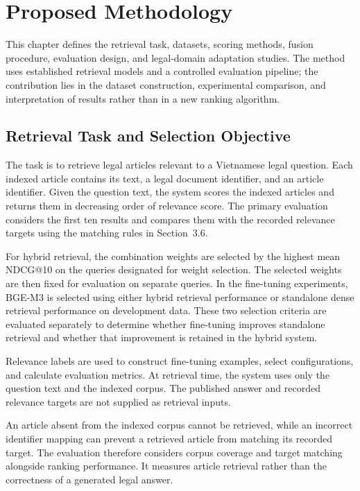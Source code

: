 \chapter{Proposed Methodology}

This chapter defines the retrieval task, datasets, scoring methods, fusion procedure, evaluation design, and legal-domain adaptation studies. The method uses established retrieval models and a controlled evaluation pipeline; the contribution lies in the dataset construction, experimental comparison, and interpretation of results rather than in a new ranking algorithm.

\section{Retrieval Task and Selection Objective}

The task is to retrieve legal articles relevant to a Vietnamese legal question. Each indexed article contains its text, a legal document identifier, and an article identifier. Given the question text, the system scores the indexed articles and returns them in decreasing order of relevance score. The primary evaluation considers the first ten results and compares them with the recorded relevance targets using the matching rules in Section~3.6.

For hybrid retrieval, the combination weights are selected by the highest mean NDCG@10 on the queries designated for weight selection. The selected weights are then fixed for evaluation on separate queries. In the fine-tuning experiments, BGE-M3 is selected using either hybrid retrieval performance or standalone dense retrieval performance on development data. These two selection criteria are evaluated separately to determine whether fine-tuning improves standalone retrieval and whether that improvement is retained in the hybrid system.

Relevance labels are used to construct fine-tuning examples, select configurations, and calculate evaluation metrics. At retrieval time, the system uses only the question text and the indexed corpus. The published answer and recorded relevance targets are not supplied as retrieval inputs.

An article absent from the indexed corpus cannot be retrieved, while an incorrect identifier mapping can prevent a retrieved article from matching its recorded target. The evaluation therefore considers corpus coverage and target matching alongside ranking performance. It measures article retrieval rather than the correctness of a generated legal answer.

